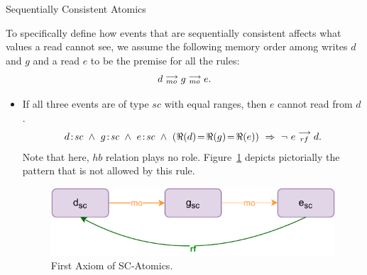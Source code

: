         \begin{axiom}{Sequentially Consistent Atomics}
            \label{SeqCsAt}   
            
            To specifically define how events that are sequentially consistent affects what values a read cannot see, we assume the following memory order among writes $d$ and $g$ and a read $e$ to be the premise for all the rules:  
            \begin{align*}
                d \stackrel{\longrightarrow}{_{mo}} g \stackrel{\longrightarrow}{_{mo}} e.
            \end{align*}
               
            \begin{itemize}
                \item If all three events are of type $sc$ with equal ranges, then $e$ cannot read from $d$.
                    \begin{align*}
                        \et{d}{sc}\ \wedge\ \et{g}{sc}\ \wedge\ \et{e}{sc} 
                        \ \wedge \ (\Re(d) \!=\! \Re(g) \!=\! \Re(e))
                        \ \Rightarrow{} \ 
                        \neg \ \reln{e}{rf}{d}.
                    \end{align*} 
                    Note that here, $hb$ relation plays no role. 
                    Figure~\ref{model:sc_atomics(1)} depicts pictorially the pattern that is not allowed by this rule.
                    \begin{figure}[H]
                        \centering 
                        \includegraphics[scale=0.7]{3.ECMAScriptMemoryModel/SequentialAtomics1.pdf}
                        \caption{First Axiom of SC-Atomics.}
                        \label{model:sc_atomics(1)}
                    \end{figure}
                    

\end{itemize}
\end{axiom}
